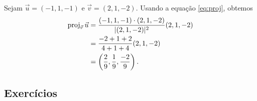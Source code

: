 \begin{ex}
  Sejam $\vec{u}=(-1,1,-1)$ e $\vec{v}=(2,1,-2)$. Usando a equação \eqref{eq:proj}, obtemos
  \begin{align}
    \operatorname{proj}_{\vec{v}}\vec{u} &= \frac{(-1,1,-1)\cdot(2,1,-2)}{|(2,1,-2)|^2}(2,1,-2)\\
                           &= \frac{-2+1+2}{4+1+4}(2,1,-2)\\
                           &= \left(\frac{2}{9},\frac{1}{9},\frac{-2}{9}\right).
  \end{align}
\end{ex}

\emconstrucao

\subsection*{Exercícios}

\emconstrucao